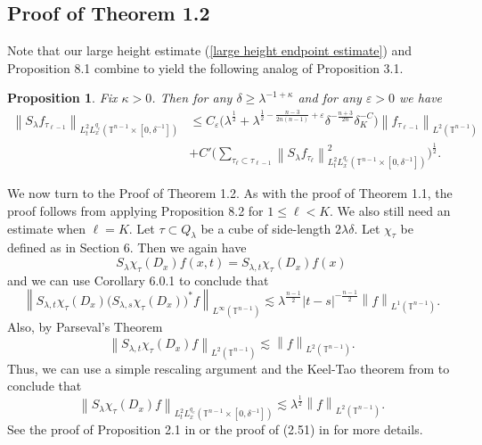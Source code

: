 \documentclass[11pt]{amsart}
\numberwithin{equation}{section}
\newcommand{\Tn}{\mathbb{T}^{n-1}}
\newcommand{\la}{\lambda}
\newcommand\norm[1]{\left\lVert#1\right\rVert}
\newcommand{\lpnorm}[3]{\norm{#1}_{L^{#2}(#3)}}
\newcommand{\mixlpnorm}[4]{\norm{#1}_{L^{#2}_{t} L^{#3}_{x}(#4)}}
\newcommand{\Sl}{S_{\la}}
\newcommand{\dK}[1]{\delta_{K}^{#1}}
\newtheorem{proposition}{Proposition}[section]
\begin{document}
\subsection{Proof of Theorem 1.2}
Note that our large height estimate (\ref{large height endpoint estimate}) and Proposition 8.1 combine to yield the following analog of Proposition 3.1.
\begin{proposition}
    Fix $\kappa > 0$. Then for any $\delta \geq \la^{-1 + \kappa}$ and for any $\varepsilon  > 0$ we have
    \begin{equation}
    \begin{split}
        \mixlpnorm{\Sl f_{\tau_{\ell - 1}}}{2}{q_e}{\Tn \times [0,\delta^{-1}]} &\leq C_{\varepsilon}\big(\la^{\frac{1}{2}} +  \la^{\frac{1}{2} - \frac{n-3}{2n(n-1)}+\varepsilon}\delta^{-\frac{n+3}{2n}}\dK{-C}\big)\lpnorm{f_{\tau_{\ell - 1}}}{2}{\Tn} \\ 
        &+ C'\Big(\sum_{\tau_{\ell} \subset \tau_{\ell - 1}}\mixlpnorm{\Sl f_{\tau_{\ell}}}{2}{q_e}{\Tn \times [0, \delta^{-1}]}^2\Big)^{\frac{1}{2}}.
    \end{split}
    \end{equation}
\end{proposition}
We now turn to the Proof of Theorem 1.2. As with the proof of Theorem 1.1, the proof follows from applying Proposition 8.2 for $1 \leq \ell < K$. We also still need an estimate when $\ell = K$. Let $\tau \subset Q_{\la}$ be a cube of side-length $2\la \delta$. Let $\chi_{\tau}$ be defined as in Section 6. Then we again have
\begin{equation}
    \Sl \chi_{\tau}(D_x)f(x, t) = S_{\la, t} \chi_{\tau}(D_x)f(x) 
\end{equation}
and we can use Corollary 6.0.1 to conclude that
\begin{equation}
    \lpnorm{S_{\la, t}\chi_{\tau}(D_x) \big( S_{\la,s} \chi_{\tau}(D_x)\big)^{*} f}{\infty}{\Tn} \lesssim\la^{\frac{n-1}{2}}|t-s|^{-\frac{n-1}{2}}\lpnorm{f}{1}{\Tn}.
\end{equation}
Also, by Parseval's Theorem
\begin{equation}
    \lpnorm{S_{\la, t}\chi_{\tau}(D_x)f}{2}{\Tn} \lesssim \lpnorm{f}{2}{\Tn}.
\end{equation}
Thus, we can use a simple rescaling argument and the Keel-Tao theorem from \cite{KT} to conclude that
\begin{equation} \label{endpoint K scale estimate}
     \mixlpnorm{\Sl \chi_{\tau}(D_x)f}{2}{q_e}{\Tn \times [0, \delta^{-1}]} \lesssim \la^{\frac{1}{2}}\lpnorm{f}{2}{\Tn}.
\end{equation}
See the proof of Proposition 2.1 in \cite{HSSchro} or the proof of (2.51) in \cite{HuangSoggeStrichartz} for more details.
\end{document}
